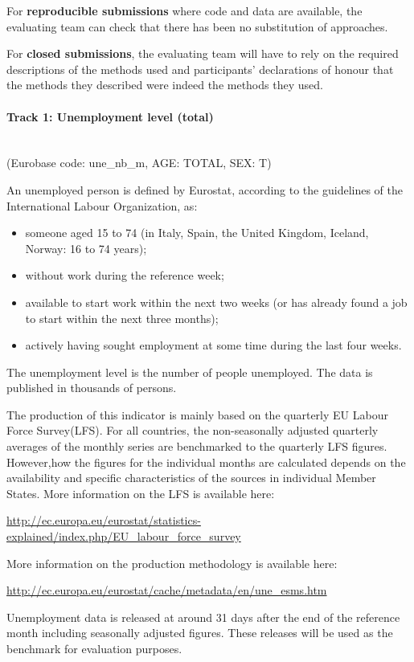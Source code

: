 \documentclass[12pt]{article}
\begin{document}
For \textbf{reproducible submissions} where code and data are available, the evaluating team can check that there has been no substitution of approaches. 

For \textbf{closed submissions}, the evaluating team will have to rely on the required descriptions of the methods used and participants’ declarations of honour that the methods they described were indeed the methods they used.


\paragraph{Track 1:  Unemployment level (total)}
\textbf{ }\\
(Eurobase code: une\_nb\_m, AGE: TOTAL, SEX: T)

An unemployed person is defined by Eurostat, according to the guidelines of the International Labour Organization, as:

\begin{itemize}
	\item{someone aged 15 to 74 (in Italy, Spain, the United Kingdom, Iceland, Norway: 16 to 74 years);}
	\item{without work during the reference week;}
	\item{available to start work within the next two weeks (or has already found a job to start within the next three months);}
	\item{actively having sought employment at some time during the last four weeks.}
\end{itemize}
The unemployment level is the number of people unemployed. The data is published in thousands of persons. 

The production of this indicator is mainly based on the quarterly EU Labour Force Survey(LFS). For all countries, the non-seasonally adjusted quarterly averages of the monthly series are benchmarked to the quarterly LFS figures. However,how the figures for the individual months are calculated depends on the availability and specific characteristics of the sources in individual Member States.
More information on the LFS is available here:

\url{http://ec.europa.eu/eurostat/statistics-explained/index.php/EU_labour_force_survey}

More information on the production methodology is available here:

\url{http://ec.europa.eu/eurostat/cache/metadata/en/une_esms.htm}

Unemployment data is released at around 31 days after the end of the reference month including seasonally adjusted figures. These releases will be used as the benchmark for evaluation purposes. 
\end{document}
